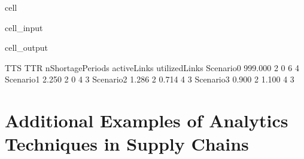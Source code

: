 \documentclass[letterpaper,10pt,english]{jupyterBook}
\begin{document}
\begin{sphinxuseclass}{cell}\begin{sphinxVerbatimInput}

\begin{sphinxuseclass}{cell_input}
\begin{sphinxVerbatim}[commandchars=\\\{\}]
\PYG{p}{[}\PYG{p}{]}

\end{sphinxVerbatim}

\end{sphinxuseclass}\end{sphinxVerbatimInput}
\begin{sphinxVerbatimOutput}

\begin{sphinxuseclass}{cell_output}
\noindent{}

\begin{sphinxVerbatim}[commandchars=\\\{\}]
               TTS TTR nShortagePeriods activeLinks utilizedLinks
Scenario\PYGZus{}0 999.000   2                0           6             4
Scenario\PYGZus{}1   2.250   2                0           4             3
Scenario\PYGZus{}2   1.286   2            0.714           4             3
Scenario\PYGZus{}3   0.900   2            1.100           4             3
\end{sphinxVerbatim}

\end{sphinxuseclass}\end{sphinxVerbatimOutput}

\end{sphinxuseclass}
\sphinxstepscope


\part{Additional Examples of Analytics Techniques in Supply Chains}

\sphinxstepscope
\end{document}
